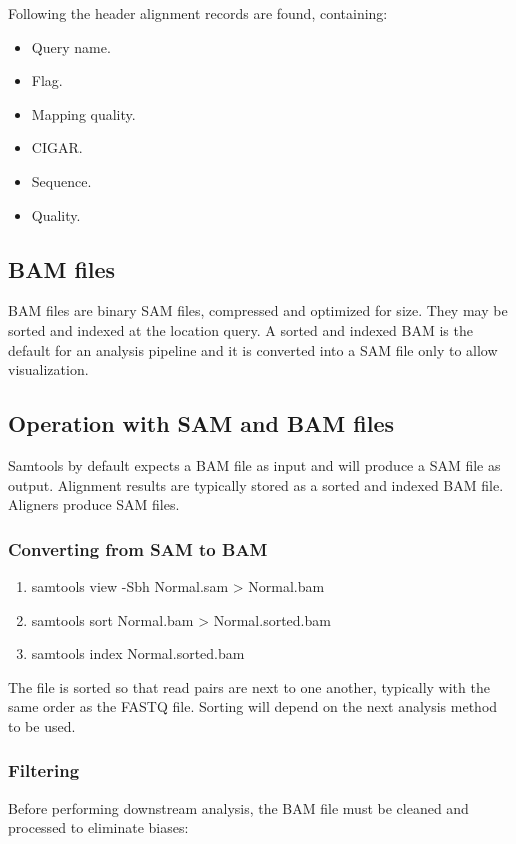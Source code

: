 		Following the header alignment records are found, containing:

		\begin{multicols}{2}
			\begin{itemize}
				\item Query name.
				\item Flag.
				\item Mapping quality.
				\item CIGAR.
				\item Sequence.
				\item Quality.
			\end{itemize}
		\end{multicols}

	\subsection{BAM files}
	BAM files are binary SAM files, compressed and optimized for size.
	They may be sorted and indexed at the location query.
	A sorted and indexed BAM is the default for an analysis pipeline and it is converted into a SAM file only to allow visualization.

	\subsection{Operation with SAM and BAM files}
	Samtools by default expects a BAM file as input and will produce a SAM file as output.
	Alignment results are typically stored as a sorted and indexed BAM file.
	Aligners produce SAM files.

		\subsubsection{Converting from SAM to BAM}

		\begin{enumerate}
			\item samtools view -Sbh Normal.sam > Normal.bam
			\item samtools sort Normal.bam > Normal.sorted.bam
			\item samtools index Normal.sorted.bam
		\end{enumerate}

		The file is sorted so that read pairs are next to one another, typically with the same order as the FASTQ file.
		Sorting will depend on the next analysis method to be used.

		\subsubsection{Filtering}
		Before performing downstream analysis, the BAM file must be cleaned and processed to eliminate biases:

